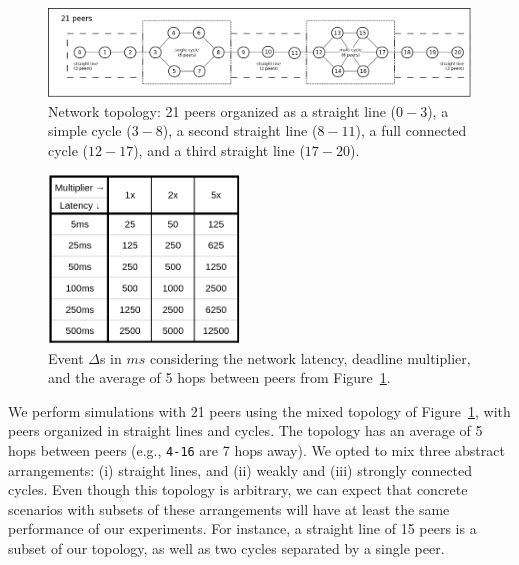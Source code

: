 \documentclass[10pt,journal,compsoc]{IEEEtran}
\newcommand{\code}[1]  {\texttt{\small{#1}}}
\begin{document}
\begin{figure}
  \centering
  \includegraphics[width=\linewidth]{topo}
  \caption{
    \label{fig.topo}
    Network topology: 21 peers organized as a straight line ($0-3$), a simple
    cycle ($3-8$), a second straight line ($8-11$), a full connected cycle
    ($12-17$), and a third straight line ($17-20$).
  }
\end{figure}

\begin{figure}
  \centering
  \includegraphics[width=2in]{mult}
  \caption{
    \label{fig.mult}
Event $\Delta$s in $ms$ considering the network latency, deadline multiplier,
and the average of 5 hops between peers from Figure~\ref{fig.topo}.
    }
\end{figure}

We perform simulations with 21 peers using the mixed topology of
Figure~\ref{fig.topo}, with peers organized in straight lines and cycles.
The topology has an average of 5 hops between peers (e.g., \code{4-16} are 7
hops away).
We opted to mix three abstract arrangements:
    (i) straight lines, and (ii) weakly and (iii) strongly connected cycles.
Even though this topology is arbitrary, we can expect that concrete scenarios
with subsets of these arrangements will have at least the same performance of
our experiments.
For instance, a straight line of 15 peers is a subset of our topology, as well
as two cycles separated by a single peer.

\end{document}
